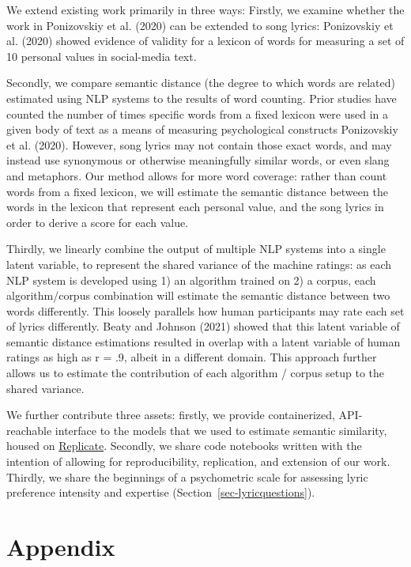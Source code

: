 \documentclass[
  letterpaper,
  DIV=11,
  numbers=noendperiod]{scrartcl}
\begin{document}
We extend existing work primarily in three ways: Firstly, we examine
whether the work in Ponizovskiy et al. (2020) can be extended to song
lyrics: Ponizovskiy et al. (2020) showed evidence of validity for a
lexicon of words for measuring a set of 10 personal values in
social-media text.

Secondly, we compare semantic distance (the degree to which words are
related) estimated using NLP systems to the results of word counting.
Prior studies have counted the number of times specific words from a
fixed lexicon were used in a given body of text as a means of measuring
psychological constructs Ponizovskiy et al. (2020). However, song lyrics
may not contain those exact words, and may instead use synonymous or
otherwise meaningfully similar words, or even slang and metaphors. Our
method allows for more word coverage: rather than count words from a
fixed lexicon, we will estimate the semantic distance between the words
in the lexicon that represent each personal value, and the song lyrics
in order to derive a score for each value.

Thirdly, we linearly combine the output of multiple NLP systems into a
single latent variable, to represent the shared variance of the machine
ratings: as each NLP system is developed using 1) an algorithm trained
on 2) a corpus, each algorithm/corpus combination will estimate the
semantic distance between two words differently. This loosely parallels
how human participants may rate each set of lyrics differently. Beaty
and Johnson (2021) showed that this latent variable of semantic distance
estimations resulted in overlap with a latent variable of human ratings
as high as r = .9, albeit in a different domain. This approach further
allows us to estimate the contribution of each algorithm / corpus setup
to the shared variance.

We further contribute three assets: firstly, we provide containerized,
API-reachable interface to the models that we used to estimate semantic
similarity, housed on
\href{https://replicate.com/eldrin/text-concept-similarity}{Replicate}.
Secondly, we share code notebooks written with the intention of allowing
for reproducibility, replication, and extension of our work. Thirdly, we
share the beginnings of a psychometric scale for assessing lyric
preference intensity and expertise (Section~\ref{sec-lyricquestions}).

\hypertarget{appendix}{%
\section{Appendix}\label{appendix}}
\end{document}
